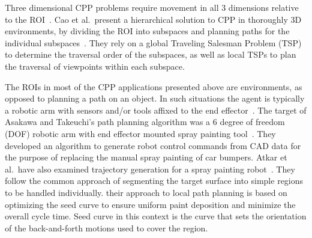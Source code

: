 Three dimensional CPP problems require movement in all 3 dimensions relative to the ROI~\cite{CPP_survey_for_robotics}.
Cao et al.\ present a hierarchical solution to CPP in thoroughly 3D environments, by dividing the ROI into subspaces and planning paths for the individual subspaces~\cite{HiCPP_cplx_3D_env}.
They rely on a global Traveling Salesman Problem (TSP) to determine the traversal order of the subspaces, as well as local TSPs to plan the traversal of viewpoints within each subspace.

The ROIs in most of the CPP applications presented above are environments, as opposed to planning a path on an object.
In such situations the agent is typically a robotic arm with sensors and/or tools affixed to the end effector~\cite{Metal_polishing_robot_sys, Automatic_spray_painting_unknown_parts}.
The target of Asakawa and Takeuchi's path planning algorithm was a 6 degree of freedom (DOF) robotic arm with end effector mounted spray painting tool~\cite{Automatic_spray_painting_path}.
They developed an algorithm to generate robot control commands from CAD data for the purpose of replacing the manual spray painting of car bumpers.
Atkar et al.\ have also examined trajectory generation for a spray painting robot~\cite{Uniform_cov_auto_surfaces, Exact_cell_decomp_orientable_surfaces}.
They follow the common approach of segmenting the target surface into simple regions to be handled individually.
their approach to local path planning is based on optimizing the seed curve to ensure uniform paint deposition and minimize the overall cycle time.
Seed curve in this context is the curve that sets the orientation of the back-and-forth motions used to cover the region.


